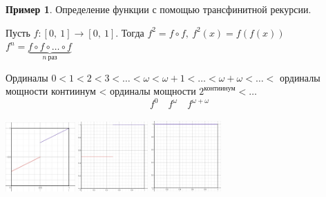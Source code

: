 \documentclass[12pt,oneside]{article}
\theoremstyle{definition}
\newtheorem{exmp}{Пример}[section]
\begin{document}
\begin{exmp}
Определение функции с помощью трансфинитной рекурсии.

Пусть $f: [0,\ 1] \longrightarrow [0,\ 1]$. Тогда $f^2 = f\circ f,\ f^2(x) = f(f(x))$
\newline
$f^n = \underbrace{f\circ f\circ\dots\circ f}_{n\ раз}$

Ординалы $0 < 1 < 2< 3<\dots < \omega < \omega + 1 < \dots < \omega+\omega < \dots <$ ординалы мощности контиинум < ординалы мощности $2^{\textrm{контиинум}} < \dots$
$$f^0\quad f^{\omega}\quad f^{\omega + \omega}$$
\\ \includegraphics[width=0.2\textwidth]{f.eps}
\includegraphics[width=0.2\textwidth]{fw.eps}
\includegraphics[width=0.2\textwidth]{fww.eps}


\end{exmp}
\end{document}
